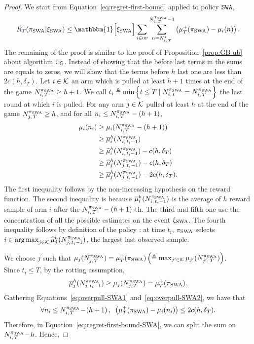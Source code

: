 \begin{proof}
We start from Equation~\ref{eq:regret-first-bound} applied to policy $\normalfont \texttt{SWA}$,
\begin{equation}
\label{eq:regret-first-bound-SWA}
\regret(\piSWA| \HPevent_{\rm SWA}) \leq  \mathbbm{1} \Big[\HPevent_{\rm SWA}\Big] \sum_{i\in \overpullSet}    \sum_{n=\NiT^\star}^{\NiT^{\piSWA}-1} \pa{\mu^+_T(\piSWA) - \mu_i(n)}.
\end{equation}
%
The remaining of the proof is similar to the proof of Proposition~\ref{prop:GB-ub} about algorithm $\pi_{\rm G}$. Instead of showing that the before last terms in the sums are equals to zeros, we will show that the terms before $h$ last one are less than $2c(h, \delta_T)$. Let $i \in \mathcal{K}$ an arm which is pulled at least $h+1$ times at the end of the game $N_{i,\,T}^{\pi_{\rm SWA}} \geq h+1$. We call $t_i \triangleq \min\left\{t\leq T\; |\; N_{i,\,t}^{\pi_{\rm SWA}} = N_{i,\,T}^{\pi_{\rm SWA}}\right\}$ the last round at which $i$ is pulled. For any arm $j \in \mathcal{K}$ pulled at least $h$ at the end of the game $N_{j,\,T}^{\pi_{\rm SWA}} \geq h$, and for all $n_i \leq N_{i,\,T}^{\pi_{\rm SWA}} -(h+1)$, 
\begin{align}
\label{eq:overpull-SWA1}
\mu_i(n_i) &\geq \mu_i(N_{i,\,T}^{\pi_{\rm SWA}} - (h+1) )\nonumber\\
 &\geq \overline{\mu}_i^h(N_{i,\,t_i -1}^{\pi_{\rm SWA}}) \nonumber\\
 &\geq \widehat{\mu}_i^h(N_{i,\,t_i -1}^{\pi_{\rm SWA}}) - c(h, \delta_T) \nonumber\\
& \geq \widehat{\mu}_j^h(N_{j,\,t_i -1}^{\pi_{\rm SWA}}) - c(h, \delta_T)  \nonumber\\
& \geq \overline{\mu}_j^h(N_{j,\,t_i -1}^{\pi_{\rm SWA}}) - 2c(h, \delta_T). 
\end{align}
The first inequality follows by the non-increasing hypothesis on the reward function. The second inequality is because $\overline{\mu}_i^h(N_{i,\,t_i -1}^{\pi_{\rm SWA}})$ is the average of $h$ reward sample of arm $i$ after the $N_{i,\,T}^{\pi_{\rm SWA}} - (h+1)$-th. The third and fifth one use the concentration of all the possible estimates on the event $\xi_{\rm SWA}$.  The fourth  inequality follows by definition of the policy : at time $t_i$, $\pi_{\rm SWA}$ selects $i \in \operatorname*{arg\,max}_{j \in \mathcal{K}} \widehat{\mu}_j^h(N_{j,\,t_i -1}^{\pi_{\rm SWA}})$, the largest last observed sample. 

We choose $j$ such that $ \mu_j(N_{j,\,T}^{\pi_{\rm SWA}}) = \mu^+_T(\pi_{\rm SWA}) \left(\triangleq \max_{j'\in \mathcal{K}} \mu_{j'}(N_{j',\,T}^{\pi_{\rm SWA}})\right)$. \\Since $t_i \leq T$, by the rotting assumption, 
\begin{equation}
\label{eq:overpull-SWA2}
 \overline{\mu}_j^h(N_{j,\,t_i -1}^{\pi_{\rm SWA}}) \geq \mu_j(N_{j,\,T}^{\pi_{\rm SWA}}) = \mu^+_T(\pi_{\rm SWA}).
\end{equation}
%
Gathering Equations~\ref{eq:overpull-SWA1} and~\ref{eq:overpull-SWA2}, we have that 
\begin{equation}
\label{eq:overpull-SWA3}
\forall n_i \leq N_{i,\,T}^{\pi_{\rm SWA}} \!-\! \left(h+1\right), \;\;   \left(\mu^+_T(\pi_{\rm SWA}) - \mu_i(n_i)\right) \leq 2c(h, \delta_T).
\end{equation}
Therefore,  in Equation~\ref{eq:regret-first-bound-SWA}, we can split the sum on $N_{i,\,T}^{\pi_{\rm SWA}} \!-\! h$. Hence, 


\end{proof}
